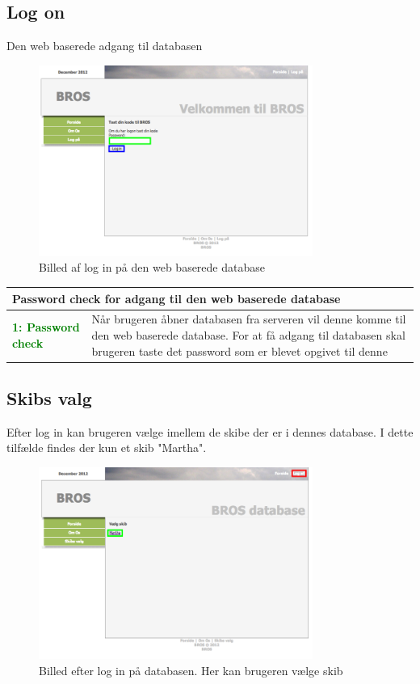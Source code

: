 \subsection*{Log on}
Den web baserede adgang til databasen
\begin{figure}[H]
	\centering
	\includegraphics[width=0.8\textwidth]{billeder/database/web_pass}
	\caption{Billed af log in på den web baserede database}
	\label{fig:web_pass}
\end{figure}

\begin{table}[H]
\begin{tabular}{l p{12.5cm}}
\multicolumn{2}{l}{Password check for adgang til den web baserede database } \\
\hline
\textcolor{green}{\textbf{1: Password check}}
&Når brugeren åbner databasen fra serveren vil denne komme til den web baserede database. For at få adgang til databasen skal brugeren taste det password som er blevet opgivet til denne\\
\end{tabular}
\end{table}

\subsection*{Skibs valg}
Efter log in kan brugeren vælge imellem de skibe der er i dennes database. I dette tilfælde findes der kun et skib "Martha".
\begin{figure}[H]
	\centering
	\includegraphics[width=0.8\textwidth]{billeder/database/web_ship_choice}
	\caption{Billed efter log in på databasen. Her kan brugeren vælge skib}
	\label{fig:web_ship_choice}
\end{figure}


